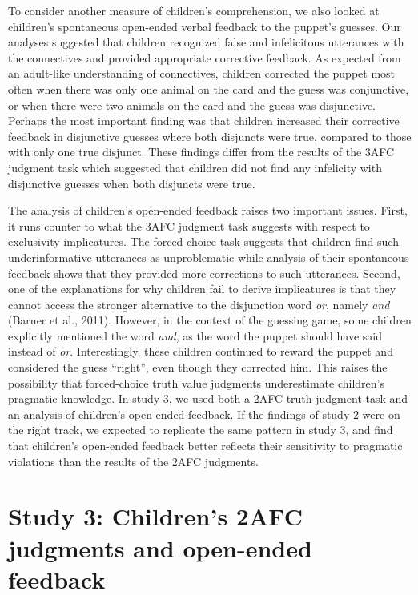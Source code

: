 \documentclass[floatsintext,man]{apa6}
\theoremstyle{definition}
\theoremstyle{definition}
\theoremstyle{definition}
\theoremstyle{remark}
\begin{document}
To consider another measure of children's comprehension, we also looked
at children's spontaneous open-ended verbal feedback to the puppet's
guesses. Our analyses suggested that children recognized false and
infelicitous utterances with the connectives and provided appropriate
corrective feedback. As expected from an adult-like understanding of
connectives, children corrected the puppet most often when there was
only one animal on the card and the guess was conjunctive, or when there
were two animals on the card and the guess was disjunctive. Perhaps the
most important finding was that children increased their corrective
feedback in disjunctive guesses where both disjuncts were true, compared
to those with only one true disjunct. These findings differ from the
results of the 3AFC judgment task which suggested that children did not
find any infelicity with disjunctive guesses when both disjuncts were
true.

The analysis of children's open-ended feedback raises two important
issues. First, it runs counter to what the 3AFC judgment task suggests
with respect to exclusivity implicatures. The forced-choice task
suggests that children find such underinformative utterances as
unproblematic while analysis of their spontaneous feedback shows that
they provided more corrections to such utterances. Second, one of the
explanations for why children fail to derive implicatures is that they
cannot access the stronger alternative to the disjunction word
\emph{or}, namely \emph{and} (Barner et al., 2011). However, in the
context of the guessing game, some children explicitly mentioned the
word \emph{and}, as the word the puppet should have said instead of
\emph{or}. Interestingly, these children continued to reward the puppet
and considered the guess \enquote{right}, even though they corrected
him. This raises the possibility that forced-choice truth value
judgments underestimate children's pragmatic knowledge. In study 3, we
used both a 2AFC truth judgment task and an analysis of children's
open-ended feedback. If the findings of study 2 were on the right track,
we expected to replicate the same pattern in study 3, and find that
children's open-ended feedback better reflects their sensitivity to
pragmatic violations than the results of the 2AFC judgments.

\section{Study 3: Children's 2AFC judgments and open-ended
feedback}\label{study3}
\end{document}
